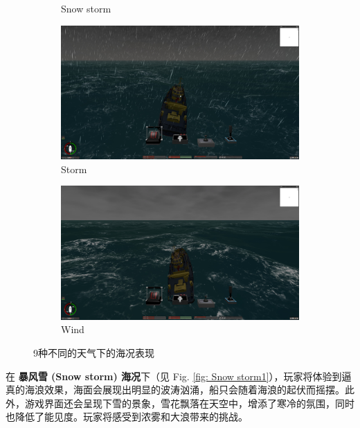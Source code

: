 \documentclass[a4paper,10pt]{article}
\begin{document}
\begin{figure}[htbp]
\begin{subfigure}{0.3\textwidth}
				\captionsetup{font=scriptsize}
				\caption{Snow storm}
				\label{fig: Snow storm}	
			\end{subfigure}
			\begin{subfigure}{0.3\textwidth}
				\includegraphics[width=\linewidth]{picture/Storm}
				\captionsetup{font=scriptsize}
				\caption{Storm}
				\label{fig: Storm}	
			\end{subfigure}
			\begin{subfigure}{0.3\textwidth}
				\includegraphics[width=\linewidth]{picture/Wind}
				\captionsetup{font=scriptsize}
				\caption{Wind}
				\label{fig: Wind}
			\end{subfigure}
			\captionsetup{font=scriptsize}
			\caption{
				\label{fig: Weather}
				9种不同的天气下的海况表现
			}
		\end{figure}
		
		在 \textbf{暴风雪 (Snow storm) 海况}下（见 Fig. \ref{fig: Snow storm1}），玩家将体验到逼真的海浪效果，海面会展现出明显的波涛汹涌，船只会随着海浪的起伏而摇摆。此外，游戏界面还会呈现下雪的景象，雪花飘落在天空中，增添了寒冷的氛围，同时也降低了能见度。玩家将感受到浓雾和大浪带来的挑战。
		
\end{document}

